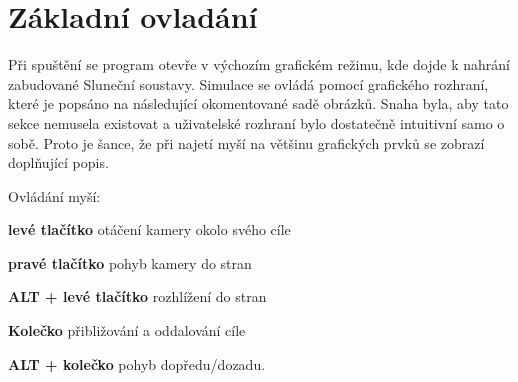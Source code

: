\section{Základní ovladání}
Při spuštění se program otevře v výchozím grafickém režimu, kde dojde k nahrání zabudované Sluneční soustavy. Simulace se ovládá pomocí grafického rozhraní, které je popsáno na následující okomentované sadě obrázků. Snaha byla, aby tato sekce nemusela existovat a uživatelské rozhraní bylo dostatečně intuitivní samo o sobě. Proto je šance, že při najetí myší na většinu grafických prvků se zobrazí doplňující popis.


Ovládání myší:
\begin{description}
	\item \textbf{levé tlačítko} otáčení kamery okolo svého cíle
	\item \textbf{pravé tlačítko} pohyb kamery do stran
	\item \textbf{ALT + levé tlačítko} rozhlížení do stran
	\item \textbf{Kolečko} přibližování a oddalování cíle
	\item \textbf{ALT + kolečko} pohyb dopředu/dozadu.
\end{description}
